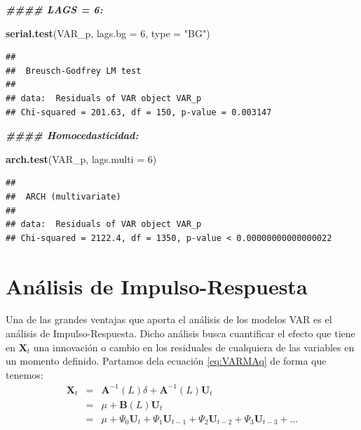 \documentclass[
]{book}
\newenvironment{Shaded}{\begin{snugshade}}{\end{snugshade}}
\newcommand{\AttributeTok}[1]{\textcolor[rgb]{0.13,0.29,0.53}{#1}}
\newcommand{\DecValTok}[1]{\textcolor[rgb]{0.00,0.00,0.81}{#1}}
\newcommand{\DocumentationTok}[1]{\textcolor[rgb]{0.56,0.35,0.01}{\textbf{\textit{#1}}}}
\newcommand{\FunctionTok}[1]{\textcolor[rgb]{0.13,0.29,0.53}{\textbf{#1}}}
\newcommand{\NormalTok}[1]{#1}
\newcommand{\StringTok}[1]{\textcolor[rgb]{0.31,0.60,0.02}{#1}}
\begin{document}
\begin{Shaded}
\begin{Highlighting}[]
\DocumentationTok{\#\#\#\# LAGS = 6:}

\FunctionTok{serial.test}\NormalTok{(VAR\_p, }\AttributeTok{lags.bg =} \DecValTok{6}\NormalTok{, }\AttributeTok{type =} \StringTok{"BG"}\NormalTok{)}
\end{Highlighting}
\end{Shaded}

\begin{verbatim}
## 
##  Breusch-Godfrey LM test
## 
## data:  Residuals of VAR object VAR_p
## Chi-squared = 201.63, df = 150, p-value = 0.003147
\end{verbatim}

\begin{Shaded}
\begin{Highlighting}[]
\DocumentationTok{\#\#\#\# Homocedasticidad:}

\FunctionTok{arch.test}\NormalTok{(VAR\_p, }\AttributeTok{lags.multi =} \DecValTok{6}\NormalTok{)}
\end{Highlighting}
\end{Shaded}

\begin{verbatim}
## 
##  ARCH (multivariate)
## 
## data:  Residuals of VAR object VAR_p
## Chi-squared = 2122.4, df = 1350, p-value < 0.00000000000000022
\end{verbatim}

\hypertarget{anuxe1lisis-de-impulso-respuesta}{%
\section{Análisis de Impulso-Respuesta}\label{anuxe1lisis-de-impulso-respuesta}}

Una de las grandes ventajas que aporta el análisis de los modelos VAR es el análisis de Impulso-Respuesta. Dicho análisis busca cuantificar el efecto que tiene en \(\mathbf{X}_t\) una innovación o cambio en los residuales de cualquiera de las variables en un momento definido. Partamos dela ecuación \eqref{eq:VARMAq} de forma que tenemos:
\begin{eqnarray}
    \mathbf{X}_t & = & \mathbf{A}^{-1}(L) \delta + \mathbf{A}^{-1}(L) \mathbf{U}_t \nonumber \\
    & = & \mu + \mathbf{B}(L) \mathbf{U}_t \nonumber \\
    & = & \mu + \Psi_0 \mathbf{U}_t + \Psi_1 \mathbf{U}_{t-1} + \Psi_2 \mathbf{U}_{t-2} + \Psi_3 \mathbf{U}_{t-3} + \ldots
\end{eqnarray}
\end{document}
